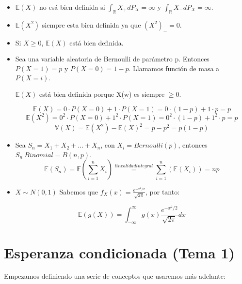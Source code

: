 \documentclass{apuntes}
\begin{document}
\begin{example}
\begin{itemize}
\item $\mathbb{E}(X)$ no esá bien definida si $\int_{\mathbb{R}}X_+ dP_X=\infty$ y $\int_{\mathbb{R}}X_- dP_X=\infty$.

\item $\mathbb{E}(X^2)$ siempre esta bien definida ya que $(X^2)_-=0$.
\item Si $X \geq 0$, $\mathbb{E}(X)$ está bien definida.
\item Sea una variable aleatoria de Bernoulli de parámetro p. Entonces $P(X=1)=p$ y $P(X=0)=1-p$. Llamamos función de masa a $P(X=i)$.

$\mathbb{E}(X)$ está bien definida porque X(w) es siempre $\geq 0$.

\[
\mathbb{E}(X)=0\cdot P(X=0)+1\cdot P(X=1)=0\cdot(1-p)+1\cdot p=p
\]
\[
\mathbb{E}(X^2)=0^2\cdot P(X=0)+1^2\cdot P(X=1)=0^2\cdot(1-p)+1^2\cdot p=p
\]
\[
\mathbb{V}(X)=\mathbb{E}(X^2)-\mathbb{E}(X)^2=p-p^2=p(1-p)
\]
\item Sea $S_n=X_1+X_2+...+X_n$, con $X_i=Bernoulli(p)$, entonces $S_n ~ Binomial=B(n,p)$.
\[
\mathbb{E}(S_n)=\mathbb{E}(\sum_{i=1}^{n}X_i)\stackrel{linealidad integral}{=}\sum_{i=1}^{n}(\mathbb{E}(X_i))=np
\]
\item $X\sim N(0,1)$
Sabemos que $f_X(x)=\frac{e^{-x^2/2}}{\sqrt{2\pi}}$, por tanto:

\[
\mathbb{E}(g(X))=\int_{-\infty}^{\infty}g(x)\frac{e^{-x^2/2}}{\sqrt{2\pi}}dx
\]
\end{itemize}
\end{example}

\chapter{Esperanza condicionada (Tema 1)}

Empezamos definiendo una serie de conceptos que usaremos más adelante:
\end{document}

